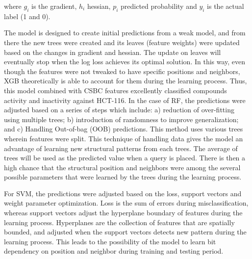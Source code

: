 \begin{equation}  
   [ g_i = p_i - y_i ] [ h_i = p_i \times (1 - p_i) ]
    \label{eq:gradienthessian}
\end{equation}
where $g_{i}$ is the gradient, $h_{i}$ hessian, $p_{i}$ predicted probability and $y_{i}$ is the actual label (1 and 0). 

The model is designed to create initial predictions from a weak model, and from there the new trees were created and its leaves (feature weights) were updated based on the changes in gradient and hessian. The update on leaves will eventually stop when the log loss achieves its optimal solution. In this way, even though the features were not tweaked to have specific positions and neighbors, XGB theoretically is able to account for them during the learning process. Thus, this model combined with CSBC features excellently classified compounds activity and inactivity against HCT-116. In the case of RF, the predictions were adjusted based on a series of steps which include: a) reduction of over-fitting using multiple trees; b) introduction of randomness to improve generalization; and c) Handling Out-of-bag (OOB) predictions. This method uses various trees wherein features were split. This technique of handling data gives the model an advantage of learning new structural patterns from each trees. The average of trees will be used as the predicted value when a query is placed. There is then a high chance that the structural position and neighbors were among the several possible parameters that were learned by the trees during the learning process. 

For SVM, the predictions were adjusted based on the loss, support vectors and weight parameter optimization. Loss is the sum of errors during misclassification, whereas support vectors adjust the hyperplane boundary of features during the learning process. Hyperplanes are the collection of features that are spatially bounded, and adjusted when the support vectors detects new pattern during the learning process. This leads to the possibility of the model to learn bit dependency on position and neighbor during training and testing period.

